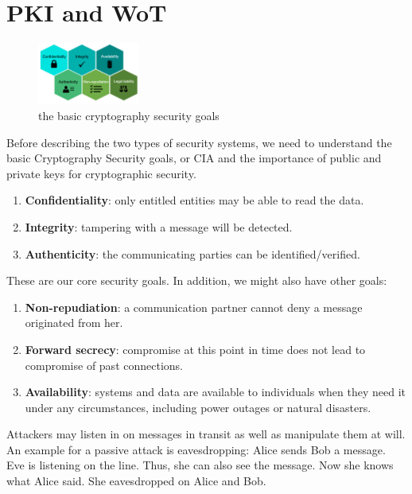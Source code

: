 \section{PKI and WoT}
\begin{figure}[H] %
    \centering %
    \includegraphics[width=0.3\textwidth]{figures/cia.png} %
    \caption{the basic cryptography security goals} %
    \label{Fig.2: the basic Cryptography Security goals} %
\end{figure}
Before describing the two types of security systems, we need to understand the basic 
Cryptography Security goals, or CIA and the importance of public and private keys 
for cryptographic security\cite{b31}.
\begin{enumerate}[]
    \item \textbf{Conﬁdentiality}: only entitled entities may be able to read the data.
    \item \textbf{Integrity}: tampering with a message will be detected.
    \item \textbf{Authenticity}: the communicating parties can be identiﬁed/veriﬁed.
\end{enumerate}
These are our core security goals. In addition, we might also have other goals:
\begin{enumerate}[]
    \item \textbf{Non-repudiation}: a communication partner cannot deny a message originated from her.
    \item \textbf{Forward secrecy}: compromise at this point in time does not lead to compromise of past connections.
    \item \textbf{Availability}: systems and data are available to individuals when they need it under any circumstances, including power outages or natural disasters.
\end{enumerate}
Attackers may listen in on messages in transit as well as manipulate them at will. An example
for a passive attack is eavesdropping: Alice sends Bob a message. Eve is listening on the line.
Thus, she can also see the message. Now she knows what Alice said. She eavesdropped on
Alice and Bob.


